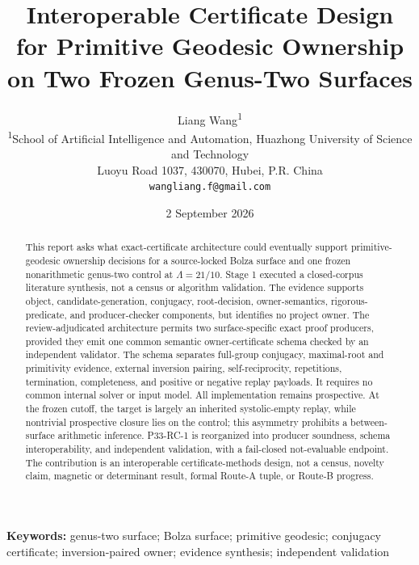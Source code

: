 \documentclass[11pt,a4paper]{article}
\title{Interoperable Certificate Design for Primitive Geodesic Ownership on Two Frozen Genus-Two Surfaces}
\author{Liang Wang\textsuperscript{1}\\
\small \textsuperscript{1}School of Artificial Intelligence and Automation, Huazhong University of Science and Technology\\
\small Luoyu Road 1037, 430070, Hubei, P.R. China\\
\small \texttt{wangliang.f@gmail.com}}
\date{2 September 2026}
\begin{document}
\maketitle

\begin{abstract}

This report asks what exact-certificate architecture could eventually support primitive-geodesic ownership decisions for a source-locked Bolza surface and one frozen nonarithmetic genus-two control at \(\Lambda=21/10\). Stage 1 executed a closed-corpus literature synthesis, not a census or algorithm validation. The evidence supports object, candidate-generation, conjugacy, root-decision, owner-semantics, rigorous-predicate, and producer-checker components, but identifies no project owner. The review-adjudicated architecture permits two surface-specific exact proof producers, provided they emit one common semantic owner-certificate schema checked by an independent validator. The schema separates full-group conjugacy, maximal-root and primitivity evidence, external inversion pairing, self-reciprocity, repetitions, termination, completeness, and positive or negative replay payloads. It requires no common internal solver or input model. All implementation remains prospective. At the frozen cutoff, the target is largely an inherited systolic-empty replay, while nontrivial prospective closure lies on the control; this asymmetry prohibits a between-surface arithmetic inference. P33-RC-1 is reorganized into producer soundness, schema interoperability, and independent validation, with a fail-closed not-evaluable endpoint. The contribution is an interoperable certificate-methods design, not a census, novelty claim, magnetic or determinant result, formal Route-A tuple, or Route-B progress.

\end{abstract}

\noindent\textbf{Keywords:} genus-two surface; Bolza surface; primitive geodesic; conjugacy certificate; inversion-paired owner; evidence synthesis; independent validation
\end{document}
